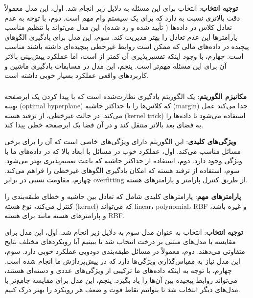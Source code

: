 \documentclass{article}
\begin{document}
\textbf{توجیه انتخاب}: انتخاب  برای این مسئله به دلایل زیر انجام شد. اول، این مدل معمولاً دقت بالاتری نسبت به  دارد که برای یک سیستم وام مهم است. دوم، با توجه به عدم تعادل کلاس در داده‌ها ( تأیید شده و  رد شده)، این مدل می‌تواند با تنظیم مناسب پارامترها این عدم تعادل را بهتر مدیریت کند. سوم، این مدل برای یادگیری الگوهای پیچیده در داده‌های مالی که ممکن است روابط غیرخطی پیچیده‌ای داشته باشند مناسب است. چهارم، با وجود اینکه تفسیرپذیری آن کمتر از  است، اما عملکرد پیش‌بینی بالاتر آن برای این مسئله مهم‌تر است. پنجم، این مدل در مسابقات یادگیری ماشین و کاربردهای واقعی عملکرد بسیار خوبی داشته است.

\subsubsection{}

\textbf{مکانیزم الگوریتم}:  یک الگوریتم یادگیری نظارت‌شده است که با پیدا کردن یک ابرصفحه بهینه (optimal hyperplane) که کلاس‌ها را با حداکثر حاشیه (margin) جدا می‌کند عمل می‌کند. در حالت غیرخطی، از ترفند هسته (kernel trick) استفاده می‌شود تا داده‌ها را به فضای بعد بالاتر منتقل کند و در آن فضا یک ابرصفحه خطی پیدا کند.

\textbf{ویژگی‌های کلیدی}: این الگوریتم دارای ویژگی‌های خاصی است که آن را برای برخی مسائل مناسب می‌کند. اول، عملکرد خوب در مسائل با ابعاد بالا که در داده‌های ما با  ویژگی وجود دارد. دوم، استفاده از حداکثر حاشیه که باعث تعمیم‌پذیری بهتر می‌شود. سوم، استفاده از ترفند هسته که امکان یادگیری الگوهای غیرخطی را فراهم می‌کند. چهارم، مقاومت نسبی در برابر overfitting از طریق کنترل پارامتر  و پارامترهای هسته.

\textbf{پارامترهای مهم}: پارامترهای کلیدی شامل  که تعادل بین حاشیه و خطای طبقه‌بندی را کنترل می‌کند، نوع هسته (kernel) که می‌تواند linear، polynomial، RBF و غیره باشد، و پارامترهای هسته مانند  برای هسته RBF.

\textbf{توجیه انتخاب}: انتخاب  به عنوان مدل سوم به دلایل زیر انجام شد. اول، این مدل برای مقایسه با مدل‌های مبتنی بر درخت انتخاب شد تا ببینیم آیا رویکردهای مختلف نتایج متفاوتی می‌دهند. دوم،  معمولاً در مسائل طبقه‌بندی دودویی عملکرد خوبی دارد. سوم، این مدل نیاز به مقیاس‌گذاری ویژگی‌ها دارد که در پیش‌پردازش ما انجام شده است. چهارم، با توجه به اینکه داده‌های ما ترکیبی از ویژگی‌های عددی و دسته‌ای هستند،  می‌تواند روابط پیچیده بین آن‌ها را یاد بگیرد. پنجم، این مدل برای مقایسه جامع‌تر با مدل‌های دیگر انتخاب شد تا بتوانیم نقاط قوت و ضعف هر رویکرد را بهتر درک کنیم.
\end{document}
